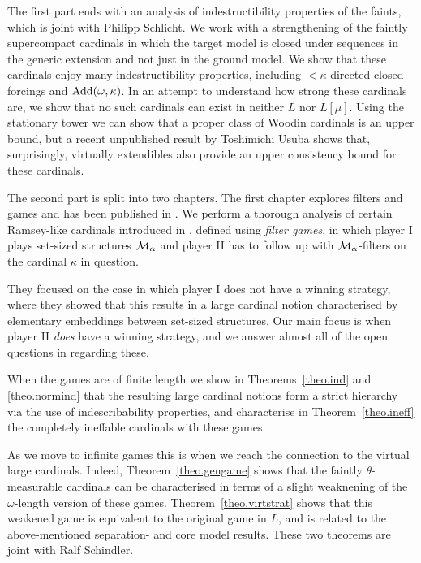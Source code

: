 \documentclass[../main]{subfiles}
\begin{document}
\begin{onehalfspacing}
\quad The first part ends with an analysis of indestructibility properties of the faints, which is joint with Philipp Schlicht. We work with a strengthening of the faintly supercompact cardinals in which the target model is closed under sequences in the generic extension and not just in the ground model. We show that these cardinals enjoy many indestructibility properties, including ${<}\kappa$-directed closed forcings and $\operatorname{Add}(\omega,\kappa)$. In an attempt to understand how strong these cardinals are, we show that no such cardinals can exist in neither $L$ nor $L[\mu]$. Using the stationary tower we can show that a proper class of Woodin cardinals is an upper bound, but a recent unpublished result by Toshimichi Usuba shows that, surprisingly, virtually extendibles also provide an upper consistency bound for these cardinals.

\quad The second part is split into two chapters. The first chapter explores filters and games and has been published in \cite{NielsenWelch}. We perform a thorough analysis of certain Ramsey-like cardinals introduced in \cite{HolySchlicht}, defined using \textit{filter games}, in which player I plays set-sized structures $\operatorname{\mathcal M}_\alpha$ and player II has to follow up with $\operatorname{\mathcal M}_\alpha$-filters on the cardinal $\kappa$ in question.

\quad They focused on the case in which player I does not have a winning strategy, where they showed that this results in a large cardinal notion characterised by elementary embeddings between set-sized structures. Our main focus is when player II \textit{does} have a winning strategy, and we answer almost all of the open questions in \cite{HolySchlicht} regarding these.

\quad When the games are of finite length we show in Theorems~\ref{theo.ind} and \ref{theo.normind} that the resulting large cardinal notions form a strict hierarchy via the use of indescribability properties, and characterise in Theorem~\ref{theo.ineff} the completely ineffable cardinals with these games.

\quad As we move to infinite games this is when we reach the connection to the virtual large cardinals. Indeed, Theorem~\ref{theo.gengame} shows that the faintly $\theta$-measurable cardinals can be characterised in terms of a slight weaknening of the $\omega$-length version of these games. Theorem~\ref{theo.virtstrat} shows that this weakened game is equivalent to the original game in $L$, and is related to the above-mentioned separation- and core model results. These two theorems are joint with Ralf Schindler. 


\end{onehalfspacing}
\end{document}
